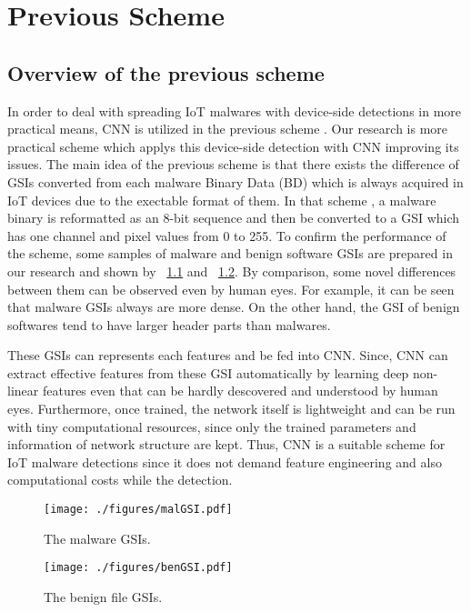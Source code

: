\chapter{Previous Scheme}\label{sec:previous_scheme}
\section{Overview of the previous scheme} 
In order to deal with spreading IoT malwares with device-side detections in more practical means, CNN is utilized in the previous scheme \cite{previous}.
Our research is more practical scheme which applys this device-side detection with CNN improving its issues.
The main idea of the previous scheme is that there exists the difference of GSIs converted from each malware Binary Data (BD) which is always acquired in IoT devices due to the exectable format of them.
In that scheme \cite{previous}, a malware binary is reformatted as an 8-bit sequence and then be converted to a GSI which has one channel and pixel values from 0 to 255.
To confirm the performance of the scheme, some samples of malware and benign software GSIs are prepared in our research and shown by \figurename~\ref{fig:malGSI} and \figurename~\ref{fig:benGSI}.
By comparison, some novel differences between them can be observed even by human eyes.
For example, it can be seen that malware GSIs always are more dense.
On the other hand, the GSI of benign softwares tend to have larger header parts than malwares.

These GSIs can represents each features and be fed into CNN.
Since, CNN can extract effective features from these GSI automatically by learning deep non-linear features even that can be hardly descovered and understood by human eyes.
Furthermore, once trained, the network itself is lightweight and can be run with tiny computational resources, since only the trained parameters and information of network structure are kept.
Thus, CNN is a suitable scheme for IoT malware detections since it does not demand feature engineering and also computational costs while the detection.

\begin{figure}[h]
 \centering
 \texttt{[image: ./figures/malGSI.pdf]}
 \caption{The malware GSIs.} 
 \label{fig:malGSI}
\end{figure}
\begin{figure}[h]
 \centering
 \texttt{[image: ./figures/benGSI.pdf]}
 \caption{The benign file GSIs.} 
 \label{fig:benGSI}
\end{figure}

